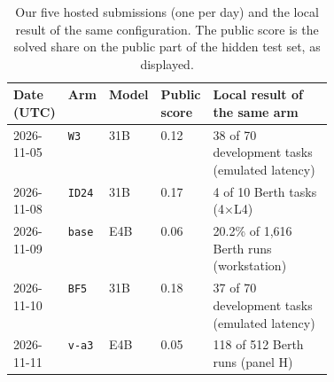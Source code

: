 \begin{table}[t]
\centering
\small
\caption{Our five hosted submissions (one per day) and the local result of the same configuration. The public score is the solved share on the public part of the hidden test set, as displayed.}
\label{tab:hosted}
\begin{tabular}{llllp{0.42\linewidth}}
\toprule
Date (UTC) & Arm & Model & Public score & Local result of the same arm \\
\midrule
2026-11-05 & \texttt{W3} & 31B & 0.12 & 38 of 70 development tasks (emulated latency) \\
2026-11-08 & \texttt{ID24} & 31B & 0.17 & 4 of 10 Berth tasks (4$\times$L4) \\
2026-11-09 & \texttt{base} & E4B & 0.06 & 20.2\% of 1{,}616 Berth runs (workstation) \\
2026-11-10 & \texttt{BF5} & 31B & 0.18 & 37 of 70 development tasks (emulated latency) \\
2026-11-11 & \texttt{v-a3} & E4B & 0.05 & 118 of 512 Berth runs (panel H) \\
\bottomrule
\end{tabular}
\end{table}
